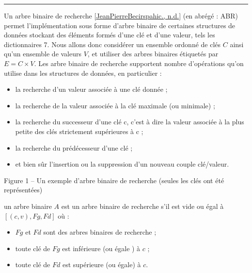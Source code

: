 \documentclass[letterpaper,10pt,english]{jupyterBook}
\begin{document}
\bigskip\hrule\bigskip


\sphinxAtStartPar
Un arbre binaire de recherche {[}\hyperlink{cite.intro:id7}{Jean\sphinxhyphen{}Pierre\sphinxhyphen{}Becirspahic., n.d.}{]} (en abrégé : ABR) permet l’implémentation sous forme d’arbre binaire de certaines structures de données stockant des éléments formés d’une clé et d’une valeur, tels les dictionnaires 7.
Nous allons donc considérer un ensemble ordonné de clés \(C\) ainsi qu’un ensemble de valeurs \(V\), et utiliser des arbres binaires étiquetés par \(E = C × V.\)
Les arbre binaire de recherche supportent nombre d’opérations qu’on utilise dans les structures de données, en particulier :
\begin{itemize}
\item {} 
\sphinxAtStartPar
la recherche d’un valeur associée à une clé donnée ;

\item {} 
\sphinxAtStartPar
la recherche de la valeur associée à la clé maximale (ou minimale) ;

\item {} 
\sphinxAtStartPar
la recherche du successeur d’une clé c, c’est à dire la valeur associée à la plus petite des clés strictement supérieures à c ;

\item {} 
\sphinxAtStartPar
la recherche du prédécesseur d’une clé ;

\item {} 
\sphinxAtStartPar
et bien sûr l’insertion ou la suppression d’un nouveau couple clé/valeur.

\end{itemize}

\sphinxAtStartPar
{}

\sphinxAtStartPar
Figure 1 – Un exemple d’arbre binaire de recherche (seules les clés ont été représentées)

\sphinxAtStartPar
{}
un arbre binaire \(A\) est un arbre binaire de recherche s’il est vide ou égal à \([(c,v),Fg, Fd]\) où :
\begin{itemize}
\item {} 
\sphinxAtStartPar
\(Fg\) et \(Fd\) sont des arbres binaires de recherche ;

\item {} 
\sphinxAtStartPar
toute clé de \(Fg\) est inférieure (ou égale ) à \(c\) ;

\item {} 
\sphinxAtStartPar
toute clé de \(Fd\) est supérieure (ou égale) à \(c\).

\end{itemize}
\end{document}
